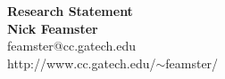 \newpage \setcounter{page}{1}

\begin{center}

{\Large\textbf{Research Statement}}\\[.1in] {\large\textbf{Nick
Feamster}}\\[.05in] feamster@cc.gatech.edu \\
http://www.cc.gatech.edu/$\sim$feamster/ \\[.1in] \end{center}
